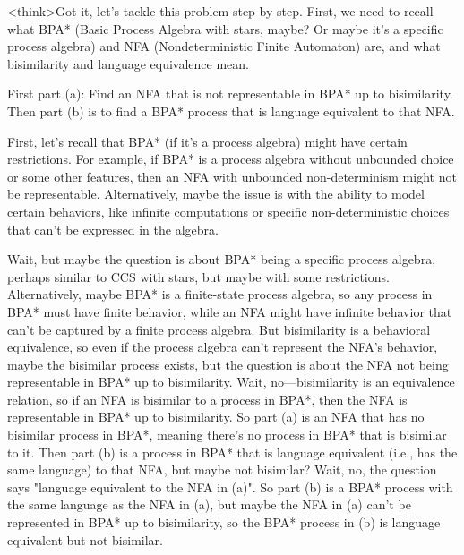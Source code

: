 <think>Got it, let's tackle this problem step by step. First, we need to recall what BPA* (Basic Process Algebra with stars, maybe? Or maybe it's a specific process algebra) and NFA (Nondeterministic Finite Automaton) are, and what bisimilarity and language equivalence mean. 

First part (a): Find an NFA that is not representable in BPA* up to bisimilarity. Then part (b) is to find a BPA* process that is language equivalent to that NFA.

First, let's recall that BPA* (if it's a process algebra) might have certain restrictions. For example, if BPA* is a process algebra without unbounded choice or some other features, then an NFA with unbounded non-determinism might not be representable. Alternatively, maybe the issue is with the ability to model certain behaviors, like infinite computations or specific non-deterministic choices that can't be expressed in the algebra.

Wait, but maybe the question is about BPA* being a specific process algebra, perhaps similar to CCS with stars, but maybe with some restrictions. Alternatively, maybe BPA* is a finite-state process algebra, so any process in BPA* must have finite behavior, while an NFA might have infinite behavior that can't be captured by a finite process algebra. But bisimilarity is a behavioral equivalence, so even if the process algebra can't represent the NFA's behavior, maybe the bisimilar process exists, but the question is about the NFA not being representable in BPA* up to bisimilarity. Wait, no—bisimilarity is an equivalence relation, so if an NFA is bisimilar to a process in BPA*, then the NFA is representable in BPA* up to bisimilarity. So part (a) is an NFA that has no bisimilar process in BPA*, meaning there's no process in BPA* that is bisimilar to it. Then part (b) is a process in BPA* that is language equivalent (i.e., has the same language) to that NFA, but maybe not bisimilar? Wait, no, the question says "language equivalent to the NFA in (a)". So part (b) is a BPA* process with the same language as the NFA in (a), but maybe the NFA in (a) can't be represented in BPA* up to bisimilarity, so the BPA* process in (b) is language equivalent but not bisimilar.

